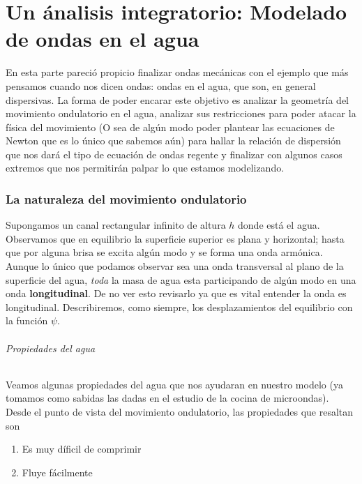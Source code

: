 \documentclass[a4paper,spanish]{article}
\numberwithin{equation}{section}
\begin{document}
\part{Un \'analisis integratorio: Modelado de ondas en el agua}

En esta parte pareci\'o propicio finalizar ondas mec\'anicas con el ejemplo que m\'as pensamos cuando nos dicen ondas: ondas en el agua, que son, en general dispersivas. La forma de poder encarar este objetivo es analizar la geometr\'ia del movimiento ondulatorio en el agua, analizar sus restricciones para poder atacar la f\'isica del movimiento (O sea de alg\'un modo poder plantear las ecuaciones de Newton que es lo \'unico que sabemos a\'un) para hallar la relaci\'on de dispersi\'on que nos dar\'a el tipo de ecuaci\'on de ondas regente y finalizar con algunos casos extremos que nos permitir\'an palpar lo que estamos modelizando.

\section{La naturaleza del movimiento ondulatorio}

Supongamos un canal rectangular infinito de altura $h$ donde est\'a el agua. Observamos que en equilibrio la superficie superior es plana y horizontal; hasta que por alguna brisa se excita alg\'un modo y se forma una onda arm\'onica. Aunque lo \'unico que podamos observar sea una onda transversal al plano de la superficie del agua, \textit{toda} la masa de agua esta participando de alg\'un modo en una onda \textbf{longitudinal}. De no ver esto revisarlo ya que es vital entender la onda es longitudinal. Describiremos, como siempre, los desplazamientos del equilibrio con la funci\'on $\psi$.

\paragraph{Propiedades del agua}
Veamos algunas propiedades del agua que nos ayudaran en nuestro modelo (ya tomamos como sabidas las dadas en el estudio de la cocina de microondas). Desde el punto de vista del movimiento ondulatorio, las propiedades que resaltan son

\begin{enumerate}
\item Es muy d\'ificil de comprimir
\item Fluye f\'acilmente
\end{enumerate}
\end{document}

